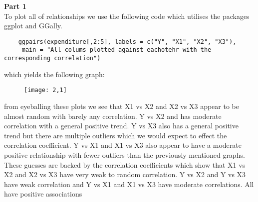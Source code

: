 \documentclass{article}
\begin{document}
\noindent\textbf{\large Part 1\\} 
To plot all of relationships we use the following code which utilises the packages ggplot and GGally.
\begin{verbatim}
	ggpairs(expenditure[,2:5], labels = c("Y", "X1", "X2", "X3"),
	 main = "All colums plotted against eachotehr with the corresponding correlation")
\end{verbatim}	
which yields the following graph:\\








































\begin{figure}[!htb]
	\centering
	\texttt{[image: 2,1]}\\
\end{figure}
from eyeballing these plots we see that X1 vs X2 and X2 vs X3 appear to be almost random with barely any correlation. Y vs X2 and has moderate correlation with a general positive trend. Y vs X3 also has a general positive trend but there are multiple outliers which we would expect to effect the correlation coefficient. Y vs X1 and X1 vs X3 also appear to have a moderate positive relationship with fewer outliers than the previously mentioned graphs.\\
These guesses are backed by the correlation coefficients which show that X1 vs X2 and X2 vs X3 have very weak to random correlation. Y vs X2 and Y vs X3 have weak correlation and Y vs X1 and X1 vs X3 have moderate correlations. All have positive associations\\
\pagebreak
\end{document}
